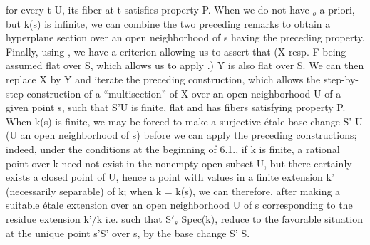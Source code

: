 for every t \hand{$\in$}U, its fiber  at t satisfies property P. When we do not
have \hand{$\xi$}$_{o}$ a priori,  but k(s) is infinite, we can combine
the two preceding remarks to obtain a hyperplane section
over an open neighborhood of s having the preceding property.  Finally,
using , we have a criterion allowing us to assert that (X resp. F being
assumed flat over S, which allows us to apply .) Y\hand{$_{\xi}$}  is also
flat over S. We can then replace X by Y\hand{$_{\xi}$} and iterate the preceding
construction, which allows  the step-by-step construction of a
“multisection”  of X over an open neighborhood U of a given point s,
such that S'\hand{$\longrightarrow$}U is finite, flat and has fibers satisfying property P.
When k(s) is finite, we may be forced to make a surjective étale base
change S'\hand{$\longrightarrow$} U (U an open neighborhood of s) before we can apply
the preceding constructions; indeed, under the conditions at the beginning of
6.1., if k is finite, a rational point over
k need not exist in the nonempty open subset U, but 
there certainly exists a closed point of U, hence a point with values in
a finite extension k' (necessarily separable) of k; when k = k(s),
we can therefore, after making a suitable  étale extension  over an open
neighborhood U of s corresponding to the residue extension k'/k
i.e. such that S$'_{s}$ \hand{$\xrightarrow{\sim}$}Spec(k), reduce to the favorable situation 
at the unique point s'\hand{$\in$}S' over s, by the base change S'\hand{$\to$} S.

